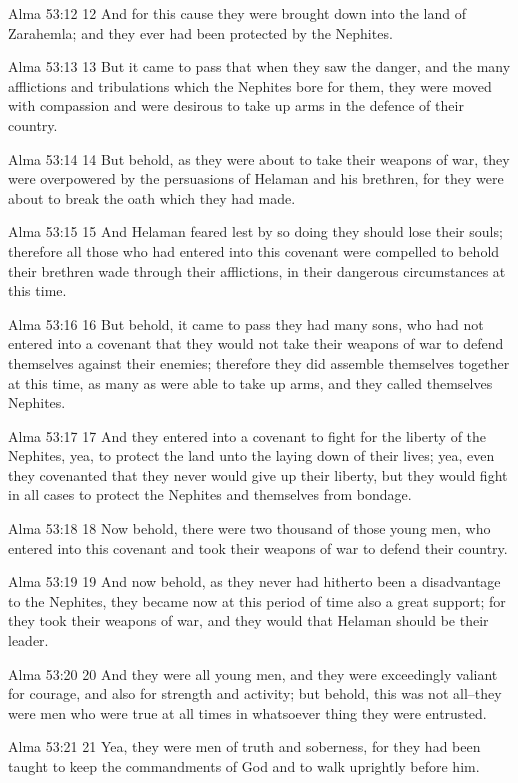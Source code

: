 Alma 53:12
 12 And for this cause they were brought down into the land of
Zarahemla; and they ever had been protected by the Nephites.

Alma 53:13
 13 But it came to pass that when they saw the danger, and the
many afflictions and tribulations which the Nephites bore for
them, they were moved with compassion and were desirous to take
up arms in the defence of their country.

Alma 53:14
 14 But behold, as they were about to take their weapons of war,
they were overpowered by the persuasions of Helaman and his
brethren, for they were about to break the oath which they had
made.

Alma 53:15
 15 And Helaman feared lest by so doing they should lose their
souls; therefore all those who had entered into this covenant
were compelled to behold their brethren wade through their
afflictions, in their dangerous circumstances at this time.

Alma 53:16
 16 But behold, it came to pass they had many sons, who had not
entered into a covenant that they would not take their weapons of
war to defend themselves against their enemies; therefore they
did assemble themselves together at this time, as many as were
able to take up arms, and they called themselves Nephites.

Alma 53:17
 17 And they entered into a covenant to fight for the liberty of
the Nephites, yea, to protect the land unto the laying down of
their lives; yea, even they covenanted that they never would give
up their liberty, but they would fight in all cases to protect
the Nephites and themselves from bondage.

Alma 53:18
 18 Now behold, there were two thousand of those young men, who
entered into this covenant and took their weapons of war to
defend their country.

Alma 53:19
 19 And now behold, as they never had hitherto been a
disadvantage to the Nephites, they became now at this period of
time also a great support; for they took their weapons of war,
and they would that Helaman should be their leader.

Alma 53:20
 20 And they were all young men, and they were exceedingly
valiant for courage, and also for strength and activity; but
behold, this was not all--they were men who were true at all
times in whatsoever thing they were entrusted.

Alma 53:21
 21 Yea, they were men of truth and soberness, for they had been
taught to keep the commandments of God and to walk uprightly
before him.

